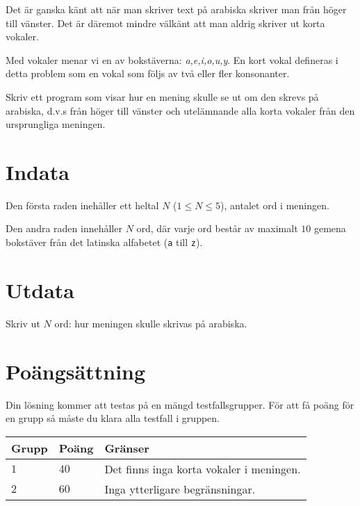 Det är ganska känt att när man skriver text på arabiska skriver man från höger till vänster.
Det är däremot mindre välkänt att man aldrig skriver ut korta vokaler.

Med vokaler menar vi en av bokstäverna: \textit{a,e,i,o,u,y}.
En kort vokal defineras i detta problem som en vokal som följs av två eller fler konsonanter.

Skriv ett program som visar hur en mening skulle se ut om den skrevs på arabiska, d.v.s från höger till vänster och utelämnande alla korta vokaler från den ursprungliga meningen.

\section*{Indata}
Den första raden inehåller ett heltal $N$ ($1 \le N \le 5$), antalet ord i meningen.

Den andra raden innehåller $N$ ord, där varje ord består av maximalt $10$ gemena bokstäver från det latinska alfabetet (\texttt{a} till \texttt{z}).

\section*{Utdata}
Skriv ut $N$ ord: hur meningen skulle skrivas på arabiska.

\section*{Poängsättning}
Din lösning kommer att testas på en mängd testfallsgrupper.
För att få poäng för en grupp så måste du klara alla testfall i gruppen.

\noindent
\begin{tabular}{| l | l | l |}
  \hline
  \textbf{Grupp} & \textbf{Poäng} & \textbf{Gränser} \\ \hline
  $1$   & $40$        & Det finns inga korta vokaler i meningen. \\ \hline
  $2$   & $60$        & Inga ytterligare begränsningar. \\ \hline
\end{tabular}
